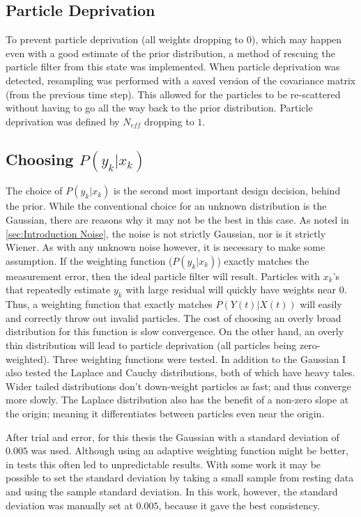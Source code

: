 \subsection{Particle Deprivation}
\label{sec:Particle Deprivation}
To prevent particle deprivation (all weights dropping to 0), which may happen even with a good
estimate of the prior distribution, a method of rescuing the particle
filter from this state was implemented. When particle deprivation was detected,
resampling was performed with a saved version of the covariance matrix (from
the previous time step). This allowed for the particles to be re-scattered
without having to go all the way back to the prior distribution. Particle
deprivation was defined by $N_{eff}$ dropping to $1$.

\subsection{Choosing $P(y_k | x_k)$}
\label{sec:Methods Weighting Function}
The choice of $P(y_k | x_k)$ is the second most important design decision, behind
the prior. While the conventional choice for an unknown distribution is the
Gaussian, there are reasons why it may not be the best in this case.
As noted in \autoref{sec:Introduction Noise}, the noise is not strictly Gaussian,
nor is it strictly Wiener. As with any unknown noise however, it is necessary
to make some assumption. If the weighting function ($P(y_k | x_k)$) exactly
matches the measurement error, then the ideal particle filter will result.
Particles with $x_k$'s that repeatedly estimate $y_k$ with large residual
will quickly have weights near 0. Thus, a weighting function that
exactly matches $P(Y(t) | X(t))$ will easily and correctly throw out invalid
particles.  The cost of choosing an overly broad distribution for this
function is slow convergence.  On the other hand, an overly thin
distribution will lead to particle deprivation (all particles
being zero-weighted). Three weighting functions were
tested. In addition to the Gaussian I also tested the Laplace and Cauchy
distributions, both of which have heavy tales.
Wider tailed distributions don't down-weight
particles as fast; and thus converge more slowly.
The Laplace distribution also has the
benefit of a non-zero slope at the origin; meaning it
differentiates between particles even near the origin.

After trial and error, for this thesis the Gaussian with a standard deviation
of $0.005$ was used. Although using an adaptive weighting function
might be better, in tests this often led to unpredictable results.
With some work it may be possible to set the standard deviation by
taking a small sample from resting data and using the sample standard deviation.
In this work, however, the standard deviation was manually set at $0.005$,
because it gave the best consistency.

